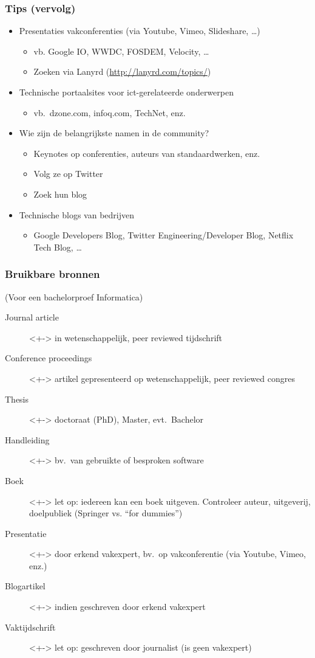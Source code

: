 \documentclass{beamer}
\begin{document}
\begin{frame}
  \frametitle{Tips (vervolg)}

  \begin{itemize}
    \item Presentaties vakconferenties (via Youtube, Vimeo, Slideshare, \dots)
      \begin{itemize}
        \item vb. Google IO, WWDC, FOSDEM, Velocity, \dots
        \item Zoeken via Lanyrd (\url{http://lanyrd.com/topics/})
      \end{itemize}
    \item<+-> Technische portaalsites voor ict-gerelateerde onderwerpen
      \begin{itemize}
        \item vb.~dzone.com, infoq.com, TechNet, enz.
      \end{itemize}
    \item<+-> Wie zijn de belangrijkste namen in de community?
      \begin{itemize}
        \item Keynotes op conferenties, auteurs van standaardwerken, enz.
        \item Volg ze op Twitter
        \item Zoek hun blog
      \end{itemize}
    \item<+-> Technische blogs van bedrijven
      \begin{itemize}
        \item Google Developers Blog, Twitter Engineering/Developer Blog, Netflix Tech Blog, \dots
      \end{itemize}
  \end{itemize}
\end{frame}


\begin{frame}
  \frametitle{Bruikbare bronnen}

  (Voor een bachelorproef Informatica)

  \begin{description}
    \item[Journal article]<+-> in wetenschappelijk, peer reviewed tijdschrift
    \item[Conference proceedings]<+-> artikel gepresenteerd op wetenschappelijk, peer reviewed congres
    \item[Thesis]<+-> doctoraat (PhD), Master, evt.~Bachelor
    \item[Handleiding]<+-> bv.~van gebruikte of besproken software
    \item[Boek]<+-> let op: iedereen kan een boek uitgeven. Controleer auteur, uitgeverij, doelpubliek (Springer vs. ``for dummies'')
    \item[Presentatie]<+-> door erkend vakexpert, bv.~op vakconferentie (via Youtube, Vimeo, enz.)
    \item[Blogartikel]<+-> indien geschreven door erkend vakexpert
    \item[Vaktijdschrift]<+-> let op: geschreven door journalist (is geen vakexpert)
  \end{description}
\end{frame}
\end{document}
